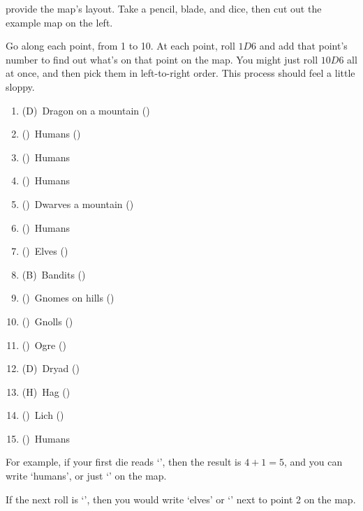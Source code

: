 \begin{multicols}{2}

provide the map's layout.
Take a pencil, blade, and dice, then cut out the example map on the left.

Go along each point, from 1 to 10.
At each point, roll $1D6$ and add that point's number to find out what's on that point on the map.
You might just roll $10D6$ all at once, and then pick them in left-to-right order.
This process should feel a little sloppy.

\begin{multicols}{2}

\begin{enumerate}
  \raggedright
  \setcounter{enumi}{1}
  \item
  (D)~Dragon on a mountain
  ()
  \item
  (\Hu)~Humans
  ()
  \item
  (\Hu)~Humans
  \item
  (\Hu)~Humans
  \item
  (\Dw)~Dwarves a mountain
  ()
  \item
  (\Hu)~Humans
  \item
  (\El)~Elves
  ()
  \item
  (B\Hu)~Bandits
  ()
  \item
  (\Gn)~Gnomes on hills
  ()
  \item
  (\Nl)~Gnolls
  ()
  \item
  (\N)~Ogre
  ()
  \item
  (D\El)~Dryad
  ()
  \item
  (H)~Hag
  ()
  \item
  (\D)~Lich
  ()
  \item
  (\Hu)~Humans
\end{enumerate}

\end{multicols}

\begin{exampletext}
  For example, if your first die reads `', then the result is $4+1 = 5$, and you can write `humans', or just `\Hu' on the map.

  If the next roll is `', then you would write `elves' or `\El' next to point 2 on the map.
\end{exampletext}


\end{multicols}
